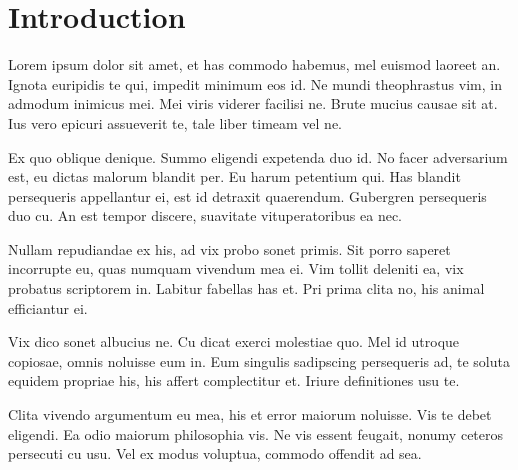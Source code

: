 \chapter{Introduction}\label{chap:intro}
Lorem ipsum dolor sit amet, et has commodo habemus, mel euismod laoreet an. Ignota euripidis te qui, impedit minimum eos id. Ne mundi theophrastus vim, in admodum inimicus mei. Mei viris viderer facilisi ne. Brute mucius causae sit at. Ius vero epicuri assueverit te, tale liber timeam vel ne.

Ex quo oblique denique. Summo eligendi expetenda duo id. No facer adversarium est, eu dictas malorum blandit per. Eu harum petentium qui. Has blandit persequeris appellantur ei, est id detraxit quaerendum. Gubergren persequeris duo cu. An est tempor discere, suavitate vituperatoribus ea nec.

Nullam repudiandae ex his, ad vix probo sonet primis. Sit porro saperet incorrupte eu, quas numquam vivendum mea ei. Vim tollit deleniti ea, vix probatus scriptorem in. Labitur fabellas has et. Pri prima clita no, his animal efficiantur ei.

Vix dico sonet albucius ne. Cu dicat exerci molestiae quo. Mel id utroque copiosae, omnis noluisse eum in. Eum singulis sadipscing persequeris ad, te soluta equidem propriae his, his affert complectitur et. Iriure definitiones usu te.

Clita vivendo argumentum eu mea, his et error maiorum noluisse. Vis te debet eligendi. Ea odio maiorum philosophia vis. Ne vis essent feugait, nonumy ceteros persecuti cu usu. Vel ex modus voluptua, commodo offendit ad sea.